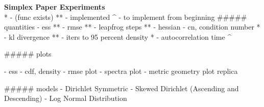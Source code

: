 \noindent \textbf{\Huge Simplex Paper Experiments}\\[0.3cm]


* - (func exists)
** - implemented
^ - to implement from beginning
##### quantities
- ess **
- rmse **
- leapfrog steps **
- hessian - cn, condition number *
- kl divergence **
- iters to 95 percent density *
- autocorrelation time ^

##### plots

- ess - cdf, density
- rmse plot
- spectra plot
- metric geometry plot replica

##### models
- Dirichlet Symmetric
- Skewed Dirichlet (Ascending and Descending)
- Log Normal Distribution
